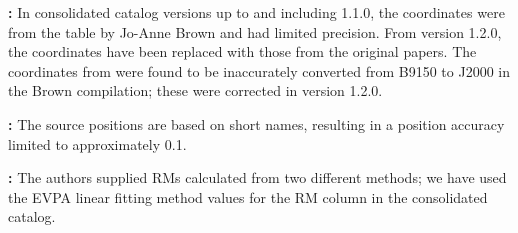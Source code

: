\documentclass[10pt,modern]{aastex63}
\begin{document}
{\bf \citet{Clegg1992,  Minter1996}:} In consolidated catalog versions up to and including 1.1.0, the coordinates were from the table by Jo-Anne Brown and had limited precision. From version 1.2.0, the coordinates have been replaced with those from the original papers. The coordinates from \citet{Minter1996} were found to be inaccurately converted from B9150 to J2000 in the Brown compilation; these were corrected in version 1.2.0.


{\bf \citet{Battye2011}:} The source positions are based on short names, resulting in a position accuracy limited to approximately 0.1\degr.

{\bf \citet{Costa2018}:} The authors supplied RMs calculated from two different methods; we have used the EVPA linear fitting method values for the RM column in the consolidated catalog.







{} %
\end{document}
